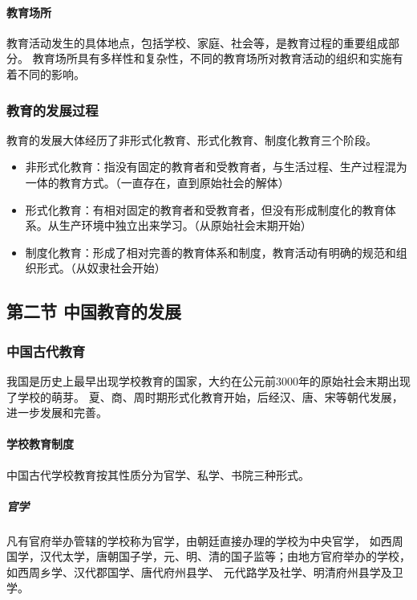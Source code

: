 \documentclass[b5paper,11pt]{article}
\begin{document}
\paragraph{教育场所}
教育活动发生的具体地点，包括学校、家庭、社会等，是教育过程的重要组成部分。
教育场所具有\textcolor{ctp-red}{多样性和复杂性}，不同的教育场所对教育活动的组织和实施有着不同的影响。

\subsubsection{教育的发展过程}
教育的发展大体经历了\textcolor{ctp-red}{非形式化教育、形式化教育、制度化教育}三个阶段。
\begin{itemize}
  \item \textcolor{ctp-red}{非形式化教育}：指没有\textcolor{ctp-maroon}{固定的教育者和受教育者}，与生活过程、生产过程混为一体的教育方式。（一直存在，直到原始社会的解体）
  \item \textcolor{ctp-red}{形式化教育}：有\textcolor{ctp-maroon}{相对固定的教育者和受教育者}，但没有形成制度化的教育体系。\textcolor{ctp-teal}{从生产环境中独立出来学习。}（从原始社会末期开始）
  \item \textcolor{ctp-red}{制度化教育}：形成了相对完善的教育体系和制度，教育活动有明确的规范和组织形式。（从奴隶社会开始）
\end{itemize}

\subsection{第二节 \space 中国教育的发展}

\subsubsection{中国古代教育}
\textcolor{ctp-red}{我国是历史上最早}出现学校教育的国家，大约在公元前\textcolor{ctp-red}{3000年}的原始社会末期出现了学校的萌芽。
夏、商、周时期\textcolor{ctp-red}{形式化教育}开始，后经汉、唐、宋等朝代发展，进一步发展和完善。
\paragraph{学校教育制度} 中国古代学校教育按其性质分为\textcolor{ctp-red}{官学、私学、书院}三种形式。

\subparagraph{官学}
凡有\textcolor{ctp-red}{官府举办}管辖的学校称为官学，由朝廷直接办理的学校为\textcolor{ctp-red}{中央官学}，
如西周国学，汉代太学，唐朝国子学，元、明、清的国子监等；由地方官府举办的\textcolor{ctp-red}{学校}，如西周乡学、汉代郡国学、唐代府州县学、
元代路学及社学、明清府州县学及卫学。
\end{document}
